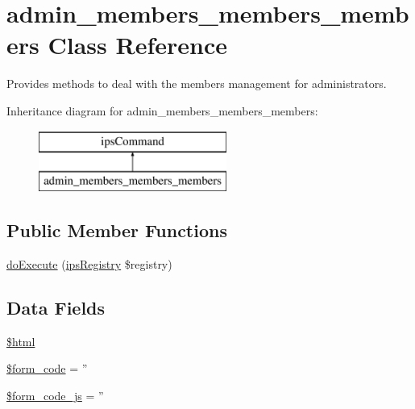 \hypertarget{classadmin__members__members__members}{\section{admin\-\_\-members\-\_\-members\-\_\-members Class Reference}
\label{classadmin__members__members__members}
}


Provides methods to deal with the members management for administrators.  


Inheritance diagram for admin\-\_\-members\-\_\-members\-\_\-members\-:\begin{figure}[H]
\begin{center}
\leavevmode
\includegraphics[height=2.000000cm]{classadmin__members__members__members}
\end{center}
\end{figure}
\subsection*{Public Member Functions}
\begin{DoxyCompactItemize}
\item 
\hyperlink{classadmin__members__members__members_afbc4e912a0604b94d47d66744c64d8ba}{do\-Execute} (\hyperlink{classips_registry}{ips\-Registry} \$registry)
\end{DoxyCompactItemize}
\subsection*{Data Fields}
\begin{DoxyCompactItemize}
\item 
\hyperlink{classadmin__members__members__members_a6f96e7fc92441776c9d1cd3386663b40}{\$html}
\item 
\hyperlink{classadmin__members__members__members_af28aee726fa3eb6c355d08a2ab655e03}{\$form\-\_\-code} = ''
\item 
\hyperlink{classadmin__members__members__members_ac68fe8a02a2efd63c3271179f4b4fbb7}{\$form\-\_\-code\-\_\-js} = ''
\end{DoxyCompactItemize}
